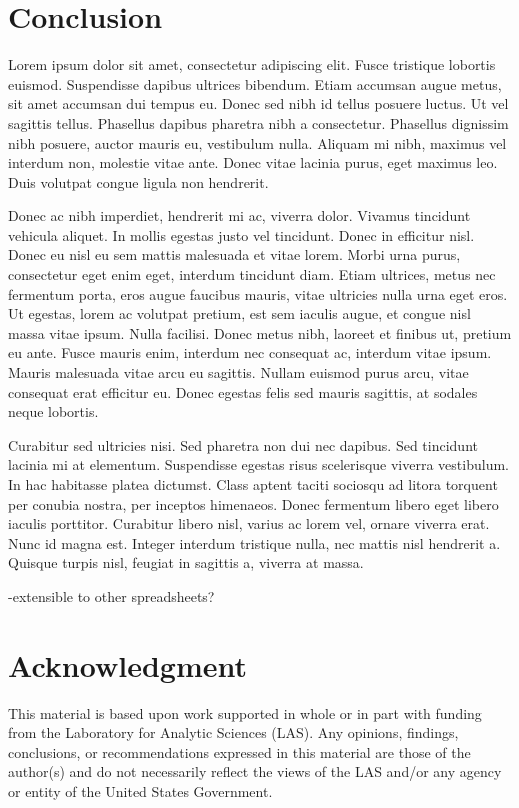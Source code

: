 \documentclass[conference]{IEEEtran}
\begin{document}
\section{Conclusion}


Lorem ipsum dolor sit amet, consectetur adipiscing elit. Fusce tristique lobortis euismod. Suspendisse dapibus ultrices bibendum. Etiam accumsan augue metus, sit amet accumsan dui tempus eu. Donec sed nibh id tellus posuere luctus. Ut vel sagittis tellus. Phasellus dapibus pharetra nibh a consectetur. Phasellus dignissim nibh posuere, auctor mauris eu, vestibulum nulla. Aliquam mi nibh, maximus vel interdum non, molestie vitae ante. Donec vitae lacinia purus, eget maximus leo. Duis volutpat congue ligula non hendrerit.

Donec ac nibh imperdiet, hendrerit mi ac, viverra dolor. Vivamus tincidunt vehicula aliquet. In mollis egestas justo vel tincidunt. Donec in efficitur nisl. Donec eu nisl eu sem mattis malesuada et vitae lorem. Morbi urna purus, consectetur eget enim eget, interdum tincidunt diam. Etiam ultrices, metus nec fermentum porta, eros augue faucibus mauris, vitae ultricies nulla urna eget eros. Ut egestas, lorem ac volutpat pretium, est sem iaculis augue, et congue nisl massa vitae ipsum. Nulla facilisi. Donec metus nibh, laoreet et finibus ut, pretium eu ante. Fusce mauris enim, interdum nec consequat ac, interdum vitae ipsum. Mauris malesuada vitae arcu eu sagittis. Nullam euismod purus arcu, vitae consequat erat efficitur eu. Donec egestas felis sed mauris sagittis, at sodales neque lobortis.

Curabitur sed ultricies nisi. Sed pharetra non dui nec dapibus. Sed tincidunt lacinia mi at elementum. Suspendisse egestas risus scelerisque viverra vestibulum. In hac habitasse platea dictumst. Class aptent taciti sociosqu ad litora torquent per conubia nostra, per inceptos himenaeos. Donec fermentum libero eget libero iaculis porttitor. Curabitur libero nisl, varius ac lorem vel, ornare viverra erat. Nunc id magna est. Integer interdum tristique nulla, nec mattis nisl hendrerit a. Quisque turpis nisl, feugiat in sagittis a, viverra at massa. 

-extensible to other spreadsheets?


\section*{Acknowledgment}
This material is based upon work supported in whole or in part with funding from the Laboratory for Analytic Sciences (LAS). Any opinions, findings, conclusions, or recommendations expressed in this material are those of the author(s) and do not necessarily reflect the views of the LAS and/or any agency or entity of the United States Government.
\end{document}

